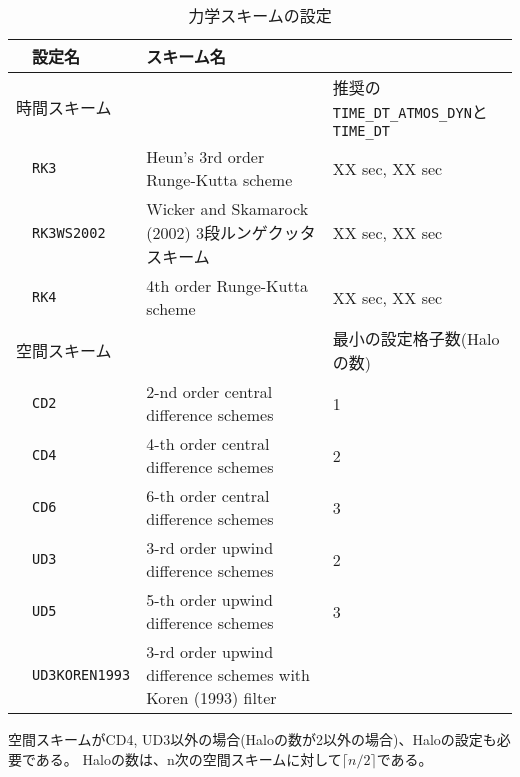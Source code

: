 \begin{table}[h]
\begin{center}
  \caption{力学スキームの設定}
  \label{tab:nml_atm_dyn}
  \begin{tabularx}{150mm}{llXX} \hline
    \rowcolor[gray]{0.9} & \multicolumn{1}{l}{設定名} & \multicolumn{1}{l}{スキーム名} & \\ \hline
    \multicolumn{3}{l}{時間スキーム} & 推奨の\verb|TIME_DT_ATMOS_DYN|と\verb|TIME_DT| \\ \hline
    & \multicolumn{1}{l}{\verb|RK3|} & \multicolumn{1}{l}{Heun's 3rd order Runge-Kutta scheme} & \multicolumn{1}{l}{XX sec, XX sec}\\
    & \multicolumn{1}{l}{\verb|RK3WS2002|} & \multicolumn{1}{X}{Wicker and Skamarock (2002) 3段ルンゲクッタスキーム} & \multicolumn{1}{l}{XX sec, XX sec}\\
    & \multicolumn{1}{l}{\verb|RK4|} & \multicolumn{1}{l}{4th order Runge-Kutta scheme} & \multicolumn{1}{l}{XX sec, XX sec}\\
    \hline
    \multicolumn{3}{l}{空間スキーム} & 最小の設定格子数(Haloの数)\\ \hline
    & \multicolumn{1}{l}{\verb|CD2|} & \multicolumn{1}{l}{2-nd order central difference schemes} & \multicolumn{1}{l}{1}\\
    & \multicolumn{1}{l}{\verb|CD4|} & \multicolumn{1}{l}{4-th order central difference schemes} & \multicolumn{1}{l}{2}\\
    & \multicolumn{1}{l}{\verb|CD6|} & \multicolumn{1}{l}{6-th order central difference schemes} & \multicolumn{1}{l}{3}\\
    & \multicolumn{1}{l}{\verb|UD3|} & \multicolumn{1}{l}{3-rd order upwind difference schemes} & \multicolumn{1}{l}{2}\\
    & \multicolumn{1}{l}{\verb|UD5|} & \multicolumn{1}{l}{5-th order upwind difference schemes} & \multicolumn{1}{l}{3}\\
    & \multicolumn{1}{l}{\verb|UD3KOREN1993|} & \multicolumn{1}{X}{3-rd order upwind difference schemes with Koren (1993) filter} & \\
\hline
  \end{tabularx}
\end{center}
\end{table}

空間スキームがCD4, UD3以外の場合(Haloの数が2以外の場合)、Haloの設定も必要である。
Haloの数は、n次の空間スキームに対して$\lceil n/2 \rceil$である。\\

\\
